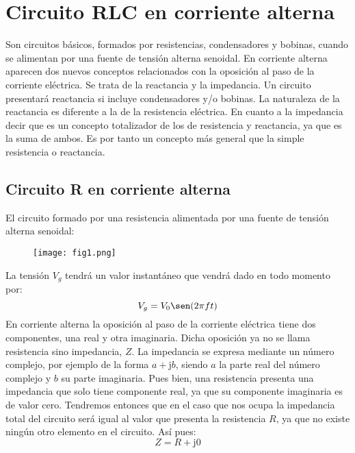 \documentclass[a4paper,12pt]{report}
\begin{document}
\chapter{Circuito RLC en corriente alterna}
Son circuitos básicos, formados por resistencias, condensadores y bobinas, cuando se alimentan por una fuente de tensión alterna senoidal. En corriente alterna aparecen dos nuevos conceptos relacionados con la oposición al paso de la corriente eléctrica. Se trata de la reactancia y la impedancia. Un circuito presentará reactancia si incluye condensadores y/o bobinas. La naturaleza de la reactancia es diferente a la de la resistencia eléctrica. En cuanto a la impedancia decir que es un concepto totalizador de los de resistencia y reactancia, ya que es la suma de ambos. Es por tanto un concepto más general que la simple resistencia o reactancia.
\section{Circuito R en corriente alterna}
El circuito formado por una resistencia alimentada por una fuente de tensión alterna senoidal:
\begin{figure}[H]
\centering
\texttt{[image: fig1.png]}
\end{figure}
La tensión $V_{g}$ tendrá un valor instantáneo que vendrá dado en todo momento por:
$$
V_{g} = V_{0}\sen(2\pi f t)
$$
En corriente alterna la oposición al paso de la corriente eléctrica tiene dos componentes, una real y otra imaginaria. Dicha oposición ya no se llama resistencia sino impedancia, $Z$. La impedancia se expresa mediante un número complejo, por ejemplo de la forma $a+\mathrm{j}b$, siendo $a$ la parte real del número complejo y $b$ su parte imaginaria. Pues bien, una resistencia presenta una impedancia que solo tiene componente real, ya que su componente imaginaria es de valor cero. Tendremos entonces que en el caso que nos ocupa la impedancia total del circuito será igual al valor que presenta la resistencia $R$, ya que no existe ningún otro elemento en el circuito. Así pues:
$$
Z = R + \mathrm{j}0
$$
\end{document}
